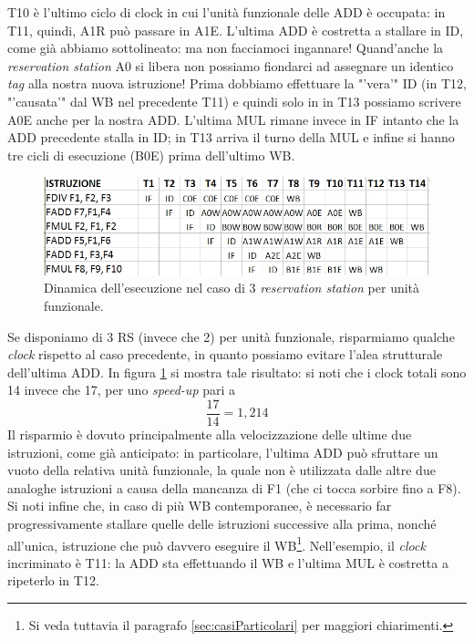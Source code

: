 T10 è l'ultimo ciclo di clock in cui l'unità funzionale delle ADD è occupata: in T11, quindi, A1R può passare in A1E.
L'ultima ADD è costretta a stallare in ID, come già abbiamo sottolineato: ma non facciamoci ingannare! Quand'anche la \textit{reservation station} A0 si libera non possiamo fiondarci ad assegnare un identico \textit{tag} alla nostra nuova istruzione! Prima dobbiamo effettuare la "'vera'" ID (in T12, "'causata'" dal WB nel precedente T11) e quindi solo in in T13 possiamo scrivere A0E anche per la nostra ADD.
L'ultima MUL rimane invece in IF intanto che la ADD precedente stalla in ID; in T13 arriva il turno della MUL e infine si hanno tre cicli di esecuzione (B0E) prima dell'ultimo WB. \\

\begin{figure}[!h]
\centering
\includegraphics[width=\columnwidth]{img/tomasEs1b}
\caption{Dinamica dell'esecuzione nel caso di 3 \textit{reservation station} per unità funzionale.}
\label{fig:tomasEs1b}
\end{figure}

Se disponiamo di 3 RS (invece che 2) per unità funzionale, risparmiamo qualche \textit{clock} rispetto al caso precedente, in quanto possiamo evitare l'alea strutturale dell'ultima ADD. In figura \ref{fig:tomasEs1b} si mostra tale risultato: si noti che i clock totali sono 14 invece che 17, per uno \textit{speed-up} pari a 
\[
\dfrac{17}{14} = 1,214
\]
Il risparmio è dovuto principalmente alla velocizzazione delle ultime due istruzioni, come già anticipato: in particolare, l'ultima ADD può sfruttare un vuoto della relativa unità funzionale, la quale non è utilizzata dalle altre due analoghe istruzioni a causa della mancanza di F1 (che ci tocca sorbire fino a F8). 
Si noti infine che, in caso di più WB contemporanee, è necessario far progressivamente stallare quelle delle istruzioni successive alla prima, nonché all'unica, istruzione che può davvero eseguire il WB\footnote{Si veda tuttavia il paragrafo \ref{sec:casiParticolari} per maggiori chiarimenti.}. Nell'esempio, il \textit{clock} incriminato è T11: la ADD sta effettuando il WB e l'ultima MUL è costretta a ripeterlo in T12.

